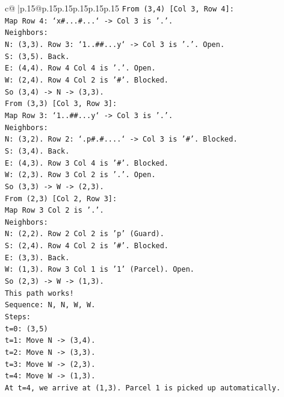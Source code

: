 \documentclass{article}
\begin{document}
{\begin{supertabular}{c@{$\;$}|p{.15\linewidth}@{}p{.15\linewidth}p{.15\linewidth}p{.15\linewidth}p{.15\linewidth}p{.15\linewidth}}
{{{\texttt{From (3,4) {[}Col 3, Row 4{]}:} \\
\texttt{Map Row 4: `x\#...\#...` {-}> Col 3 is '.'.} \\
\texttt{Neighbors:} \\
\texttt{N: (3,3). Row 3: `1..\#\#...y` {-}> Col 3 is '.'. Open.} \\
\texttt{S: (3,5). Back.} \\
\texttt{E: (4,4). Row 4 Col 4 is '.'. Open.} \\
\texttt{W: (2,4). Row 4 Col 2 is '\#'. Blocked.} \\
\texttt{So (3,4) {-}> N {-}> (3,3).} \\
\texttt{From (3,3) {[}Col 3, Row 3{]}:} \\
\texttt{Map Row 3: `1..\#\#...y` {-}> Col 3 is '.'.} \\
\texttt{Neighbors:} \\
\texttt{N: (3,2). Row 2: `.p\#.\#....` {-}> Col 3 is '\#'. Blocked.} \\
\texttt{S: (3,4). Back.} \\
\texttt{E: (4,3). Row 3 Col 4 is '\#'. Blocked.} \\
\texttt{W: (2,3). Row 3 Col 2 is '.'. Open.} \\
\texttt{So (3,3) {-}> W {-}> (2,3).} \\
\texttt{From (2,3) {[}Col 2, Row 3{]}:} \\
\texttt{Map Row 3 Col 2 is '.'.} \\
\texttt{Neighbors:} \\
\texttt{N: (2,2). Row 2 Col 2 is 'p' (Guard).} \\
\texttt{S: (2,4). Row 4 Col 2 is '\#'. Blocked.} \\
\texttt{E: (3,3). Back.} \\
\texttt{W: (1,3). Row 3 Col 1 is '1' (Parcel). Open.} \\
\texttt{So (2,3) {-}> W {-}> (1,3).} \\
\texttt{This path works!} \\
\texttt{Sequence: N, N, W, W.} \\
\texttt{Steps:} \\
\texttt{t=0: (3,5)} \\
\texttt{t=1: Move N {-}> (3,4).} \\
\texttt{t=2: Move N {-}> (3,3).} \\
\texttt{t=3: Move W {-}> (2,3).} \\
\texttt{t=4: Move W {-}> (1,3).} \\
\texttt{At t=4, we arrive at (1,3). Parcel 1 is picked up automatically.} \\
}}}
\end{supertabular}}
\end{document}
